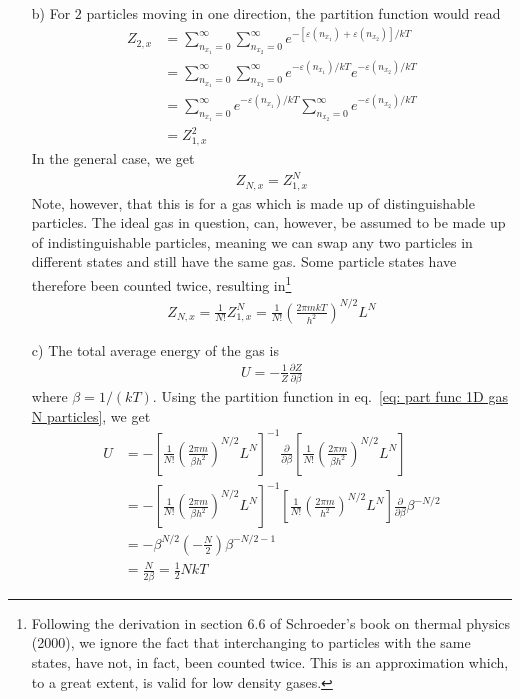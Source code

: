 \documentclass[11pt]{article}
\newcounter{excount}
\newenvironment{exercise}[1][]{\addtocounter{excount}{1} \noindent {\bf Exercise
    \arabic{excount} #1}\hspace{2mm}}{\vspace{4mm}}
\begin{document}
\begin{exercise}
\begin{itemize}
			
		\item[b)]
			For $2$ particles moving in one direction, the partition function would read
			\begin{align*}
				Z_{2,x} 	&= \sum_{n_{x_1}=0}^\infty \sum_{n_{x_2}=0}^\infty e^{-[\varepsilon(n_{x_1}) + \varepsilon(n_{x_2})]/kT} \\
								&= \sum_{n_{x_1}=0}^\infty \sum_{n_{x_2}=0}^\infty e^{-\varepsilon(n_{x_1})/kT}e^{-\varepsilon(n_{x_2})/kT} \\
								&=  \sum_{n_{x_1}=0}^\infty e^{-\varepsilon(n_{x_1})/kT}\sum_{n_{x_2}=0}^\infty e^{-\varepsilon(n_{x_2})/kT} \\
								&= Z_{1,x}^2
			\end{align*}
			In the general case, we get
			\begin{align*}
				Z_{N,x} = Z_{1,x}^N
			\end{align*}
			Note, however, that this is for a gas which is made up of distinguishable particles. The ideal gas in question, can, however, be assumed to be made up of indistinguishable particles, meaning we can swap any two particles in different states and still have the same gas. Some particle states have therefore been counted twice, resulting in\footnote{Following the derivation in section 6.6 of Schroeder's book on thermal physics (2000), we ignore the fact that interchanging to particles with the same states, have not, in fact, been counted twice. This is an approximation which, to a great extent, is valid for low density gases.}
			\begin{align}
				Z_{N,x} = \frac{1}{N!}Z_{1,x}^N = \frac{1}{N!}\left( \frac{2\pi mkT}{h^2} \right) ^{N/2}L^N \label{eq: part func 1D gas N particles}
			\end{align}
		
		
		\item[c)]
			The total average energy of the gas is
			\begin{align*}
				U = -\frac{1}{Z}\frac{\partial Z}{\partial \beta}
			\end{align*}
			where $\beta = 1/(kT)$. Using the partition function in eq.~\eqref{eq: part func 1D gas N particles}, we get
			\begin{align*}
				U 	&= -\left[ \frac{1}{N!}\left( \frac{2\pi m}{\beta h^2} \right) ^{N/2}L^N \right]^{-1}\frac{\partial}{\partial \beta} \left[ \frac{1}{N!}\left( \frac{2\pi m}{\beta h^2} \right) ^{N/2}L^N \right] \\
					&= -\left[ \frac{1}{N!}\left( \frac{2\pi m}{\beta h^2} \right) ^{N/2}L^N \right]^{-1} \left[\frac{1}{N!}\left( \frac{2\pi m}{h^2} \right) ^{N/2}L^N \right] \frac{\partial}{\partial \beta} \beta ^{-N/2} \\
					&= -\beta^{N/2}\left( -\frac{N}{2} \right) \beta^{-N/2 - 1} \\
					&= \frac{N}{2\beta} = \frac{1}{2}NkT
			\end{align*}
		

\end{itemize}
\end{exercise}
\end{document}
